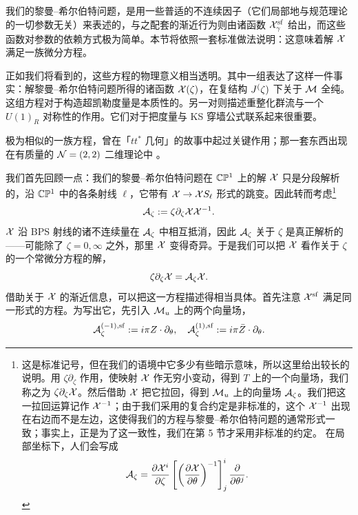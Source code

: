 我们的黎曼--希尔伯特问题，是用一些普适的不连续因子（它们局部地与规范理论的一切参数无关）来表述的，与之配套的渐近行为则由诸函数 $\mathcal{X}^{\mathrm{sf}}_\gamma$ 给出，而这些函数对参数的依赖方式极为简单。本节将依照一套标准做法说明：这意味着解 $\mathcal{X}$ 满足一族微分方程。

正如我们将看到的，这些方程的物理意义相当透明。其中一组表达了这样一件事实：解黎曼--希尔伯特问题所得的诸函数 $\mathcal{X}(\zeta)$，在复结构 $J^(\zeta)$ 下关于 $\mathcal{M}$ 全纯。这组方程对于构造超凯勒度量是本质性的。另一对则描述重整化群流与一个 $U(1)_R$ 对称性的作用。它们对于把度量与 KS 穿墙公式联系起来很重要。

极为相似的一族方程，曾在「$tt^*$ 几何」的故事中起过关键作用；那一套东西出现在有质量的 $\mathcal{N}=(2,2)$ 二维理论中 \cite{Cecotti:1993rm,Cecotti:1992qh,Cecotti:1991me,Cecotti:1993vy}。

我们首先回顾一点：我们的黎曼--希尔伯特问题在 $\mathbb{C}\mathbb{P}^1$ 上的解 $\mathcal{X}$ 只是分段解析的，沿 $\mathbb{C}\mathbb{P}^1$ 中的各条射线 $\ell$，它带有 $\mathcal{X} \to \mathcal{X} S_\ell$ 形式的跳变。因此转而考虑\footnote{这是标准记号，但在我们的语境中它多少有些暗示意味，所以这里给出较长的说明。用 $\zeta \partial_\zeta$ 作用，使映射 $\mathcal{X}$ 作无穷小变动，得到 $T$ 上的一个向量场，我们称之为 $\zeta \partial_\zeta \mathcal{X}$。然后借助 $\mathcal{X}$ 把它拉回，得到 $\mathcal{M}_u$ 上的向量场 $\mathcal{A}_\zeta$。我们把这一拉回运算记作 $\mathcal{X}^{-1}$；由于我们采用的复合约定是非标准的，这个 $\mathcal{X}^{-1}$ 出现在右边而不是左边，这使得我们的方程与黎曼--希尔伯特问题的通常形式一致；事实上，正是为了这一致性，我们在第 5 节才采用非标准的约定。%
在局部坐标下，人们会写成
\begin{equation}
\mathcal{A}_\zeta =  \frac{\partial \mathcal{X}^i}{\partial \zeta}
\left[ \left(\frac{\partial \mathcal{X}}{\partial \theta}\right)^{-1}
\right]^i_j \frac{\partial}{\partial \theta^j}.
\end{equation}
}
\begin{equation}
\mathcal{A}_\zeta := \zeta \partial_\zeta \mathcal{X} \mathcal{X}^{-1}.
\end{equation}
$\mathcal{X}$ 沿 BPS 射线的诸不连续量在 $\mathcal{A}_\zeta$ 中相互抵消，因此 $\mathcal{A}_\zeta$ 关于 $\zeta$ 是真正解析的——可能除了 $\zeta = 0, \infty$ 之外，那里 $\mathcal{X}$ 变得奇异。于是我们可以把 $\mathcal{X}$ 看作关于 $\zeta$ 的一个常微分方程的解，
\begin{equation} \label{eq:zeta-eq-general}
\zeta \partial_\zeta \mathcal{X} = \mathcal{A}_\zeta \mathcal{X}.
\end{equation}
借助关于 $\mathcal{X}$ 的渐近信息，可以把这一方程描述得相当具体。首先注意 $\mathcal{X}^{\mathrm{sf}}$ 满足同一形式的方程。为写出它，先引入 $\mathcal{M}_u$ 上的两个向量场，
\begin{equation}
\mathcal{A}_\zeta^{(-1),{\mathrm{sf}}} := i \pi Z \cdot \partial_\theta, \quad \mathcal{A}_\zeta^{(1),{\mathrm{sf}}} := i \pi \bar{Z} \cdot \partial_\theta.
\end{equation}
